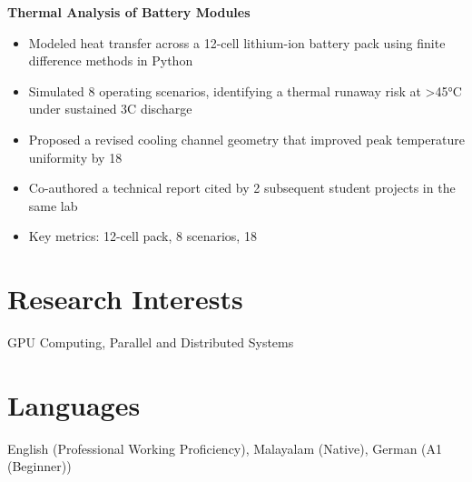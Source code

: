 \documentclass[11pt,a4paper]{article}
\begin{document}
\textbf{ Thermal Analysis of Battery Modules }
\begin{itemize}[leftmargin=*,nosep,topsep=2pt]
    
    \item Modeled heat transfer across a 12-cell lithium-ion battery pack using finite difference methods in Python
    
    \item Simulated 8 operating scenarios, identifying a thermal runaway risk at >45°C under sustained 3C discharge
    
    \item Proposed a revised cooling channel geometry that improved peak temperature uniformity by 18%
    
    \item Co-authored a technical report cited by 2 subsequent student projects in the same lab
    
    \item Key metrics: 12-cell pack, 8 scenarios, 18%
    
\end{itemize}


\section{Research Interests}
GPU Computing, Parallel and Distributed Systems

\section{Languages}
English (Professional Working Proficiency), Malayalam (Native), German (A1 (Beginner))
\end{document}
